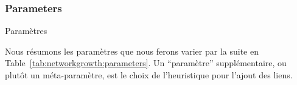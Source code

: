 


\subsubsection{Parameters}{Paramètres}


Nous résumons les paramètres que nous ferons varier par la suite en Table~\ref{tab:networkgrowth:parameters}. Un ``paramètre'' supplémentaire, ou plutôt un méta-paramètre, est le choix de l'heuristique pour l'ajout des liens.


